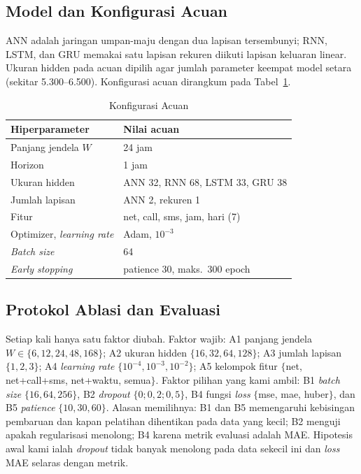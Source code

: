\documentclass[conference,a4paper]{IEEEtran}
\begin{document}
\subsection{Model dan Konfigurasi Acuan}
ANN adalah jaringan umpan-maju dengan dua lapisan tersembunyi; RNN, LSTM, dan GRU memakai satu lapisan rekuren diikuti lapisan keluaran linear. Ukuran hidden pada acuan dipilih agar jumlah parameter keempat model setara (sekitar 5.300--6.500). Konfigurasi acuan dirangkum pada Tabel~\ref{tab:acuan}.

\begin{table}[t]
\centering
\caption{Konfigurasi Acuan}
\label{tab:acuan}
\footnotesize
\begin{tabular}{@{}ll@{}}
\toprule
Hiperparameter & Nilai acuan \\
\midrule
Panjang jendela $W$ & 24 jam \\
Horizon & 1 jam \\
Ukuran hidden & ANN 32, RNN 68, LSTM 33, GRU 38 \\
Jumlah lapisan & ANN 2, rekuren 1 \\
Fitur & net, call, sms, jam, hari (7) \\
Optimizer, \emph{learning rate} & Adam, $10^{-3}$ \\
\emph{Batch size} & 64 \\
\emph{Early stopping} & patience 30, maks.\ 300 epoch \\
\bottomrule
\end{tabular}
\end{table}

\subsection{Protokol Ablasi dan Evaluasi}
Setiap kali hanya satu faktor diubah. Faktor wajib: A1 panjang jendela $W\in\{6,12,24,48,168\}$; A2 ukuran hidden $\{16,32,64,128\}$; A3 jumlah lapisan $\{1,2,3\}$; A4 \emph{learning rate} $\{10^{-4},10^{-3},10^{-2}\}$; A5 kelompok fitur $\{$net, net+call+sms, net+waktu, semua$\}$. Faktor pilihan yang kami ambil: B1 \emph{batch size} $\{16,64,256\}$, B2 \emph{dropout} $\{0;0{,}2;0{,}5\}$, B4 fungsi \emph{loss} $\{$mse, mae, huber$\}$, dan B5 \emph{patience} $\{10,30,60\}$. Alasan memilihnya: B1 dan B5 memengaruhi kebisingan pembaruan dan kapan pelatihan dihentikan pada data yang kecil; B2 menguji apakah regularisasi menolong; B4 karena metrik evaluasi adalah MAE. Hipotesis awal kami ialah \emph{dropout} tidak banyak menolong pada data sekecil ini dan \emph{loss} MAE selaras dengan metrik.
\end{document}
